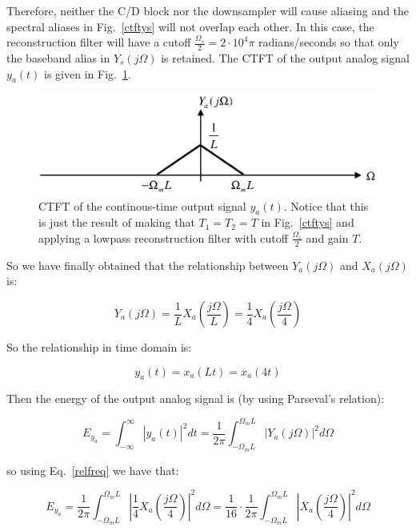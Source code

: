 \documentclass[a4paper,11pt,oneside]{article}
\begin{document}
Therefore, neither the C/D block nor the downsampler will cause aliasing and the spectral aliases in Fig.~\ref{ctftys} will not overlap each other. In this case, the reconstruction filter will have a cutoff $\frac{\Omega_s}{2}=2\cdot 10^{4}\pi$ radians/seconds so that only the baseband alias in $Y_s(j\Omega)$ is retained. The CTFT of the output analog signal $y_a(t)$ is given in Fig.~\ref{ctfty}.

\begin{figure}[h!]
\centering
\includegraphics[width=.8\textwidth]{ctfty.eps}
\caption{CTFT of the continous-time output signal $y_a(t)$. Notice that this is just the result of making that $T_1=T_2=T$ in Fig.~\ref{ctftys} and applying a lowpass reconstruction filter with cutoff $\frac{\Omega_s}{2}$ and gain $T$.}
\label{ctfty}
\end{figure}

So we have finally obtained that the relationship between $Y_a(j\Omega)$ and $X_a(j\Omega)$ is:

\begin{equation}\label{relfreq}
Y_a(j\Omega) = \frac{1}{L}X_{a}(\frac{j\Omega}{L})=\frac{1}{4}X_{a}(\frac{j\Omega}{4})
\end{equation}

So the relationship in time domain is:

\begin{equation}
y_a(t)=x_a(Lt)=x_a(4t)
\end{equation}

Then the energy of the output analog signal is (by using Parseval's relation):

\begin{equation}\label{eqenergy}
E_{y_a}=\int_{-\infty}^{\infty}|y_a(t)|^2dt=\frac{1}{2\pi}\int_{-\Omega_mL}^{\Omega_mL}|Y_a(j\Omega)|^2d\Omega
\end{equation}

so using Eq.~\ref{relfreq} we have that:

\begin{equation}\label{energyfreq}
E_{y_a}=\frac{1}{2\pi}\int_{-\Omega_mL}^{\Omega_mL}|\frac{1}{4}X_a(\frac{j\Omega}{4})|^2d\Omega=\frac{1}{16}\cdot\frac{1}{2\pi}\int_{-\Omega_mL}^{\Omega_mL}|X_a(\frac{j\Omega}{4})|^2d\Omega
\end{equation}
\end{document}
